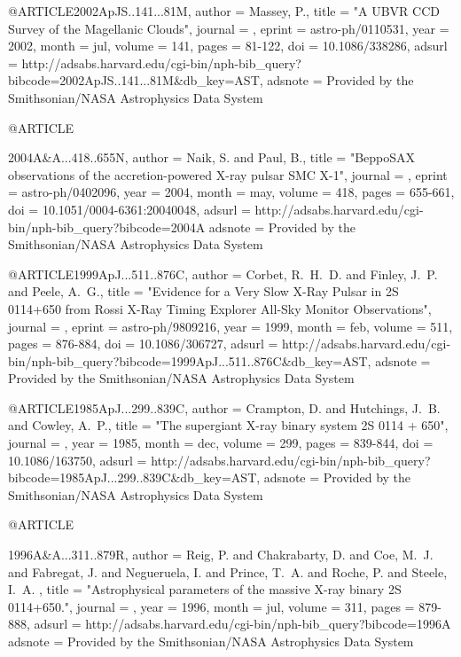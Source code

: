 {{{{{{{{{{@ARTICLE{2002ApJS..141...81M,
   author = {{Massey}, P.},
    title = "{A UBVR CCD Survey of the Magellanic Clouds}",
  journal = {\apjs},
   eprint = {astro-ph/0110531},
     year = 2002,
    month = jul,
   volume = 141,
    pages = {81-122},
      doi = {10.1086/338286},
   adsurl = {http://adsabs.harvard.edu/cgi-bin/nph-bib_query?bibcode=2002ApJS..141...81M&db_key=AST},
  adsnote = {Provided by the Smithsonian/NASA Astrophysics Data System}
}



@ARTICLE{2004A&A...418..655N,
   author = {{Naik}, S. and {Paul}, B.},
    title = "{BeppoSAX observations of the accretion-powered X-ray pulsar SMC X-1}",
  journal = {\aap},
   eprint = {astro-ph/0402096},
     year = 2004,
    month = may,
   volume = 418,
    pages = {655-661},
      doi = {10.1051/0004-6361:20040048},
   adsurl = {http://adsabs.harvard.edu/cgi-bin/nph-bib_query?bibcode=2004A%
  adsnote = {Provided by the Smithsonian/NASA Astrophysics Data System}
}



@ARTICLE{1999ApJ...511..876C,
   author = {{Corbet}, R.~H.~D. and {Finley}, J.~P. and {Peele}, A.~G.},
    title = "{Evidence for a Very Slow X-Ray Pulsar in 2S 0114+650 from Rossi X-Ray Timing Explorer All-Sky Monitor Observations}",
  journal = {\apj},
   eprint = {astro-ph/9809216},
     year = 1999,
    month = feb,
   volume = 511,
    pages = {876-884},
      doi = {10.1086/306727},
   adsurl = {http://adsabs.harvard.edu/cgi-bin/nph-bib_query?bibcode=1999ApJ...511..876C&db_key=AST},
  adsnote = {Provided by the Smithsonian/NASA Astrophysics Data System}
}



@ARTICLE{1985ApJ...299..839C,
   author = {{Crampton}, D. and {Hutchings}, J.~B. and {Cowley}, A.~P.},
    title = "{The supergiant X-ray binary system 2S 0114 + 650}",
  journal = {\apj},
     year = 1985,
    month = dec,
   volume = 299,
    pages = {839-844},
      doi = {10.1086/163750},
   adsurl = {http://adsabs.harvard.edu/cgi-bin/nph-bib_query?bibcode=1985ApJ...299..839C&db_key=AST},
  adsnote = {Provided by the Smithsonian/NASA Astrophysics Data System}
}



@ARTICLE{1996A&A...311..879R,
   author = {{Reig}, P. and {Chakrabarty}, D. and {Coe}, M.~J. and {Fabregat}, J. and 
	{Negueruela}, I. and {Prince}, T.~A. and {Roche}, P. and {Steele}, I.~A.
	},
    title = "{Astrophysical parameters of the massive X-ray binary 2S 0114+650.}",
  journal = {\aap},
     year = 1996,
    month = jul,
   volume = 311,
    pages = {879-888},
   adsurl = {http://adsabs.harvard.edu/cgi-bin/nph-bib_query?bibcode=1996A%
  adsnote = {Provided by the Smithsonian/NASA Astrophysics Data System}
}



}}}}}}}}}}}}
